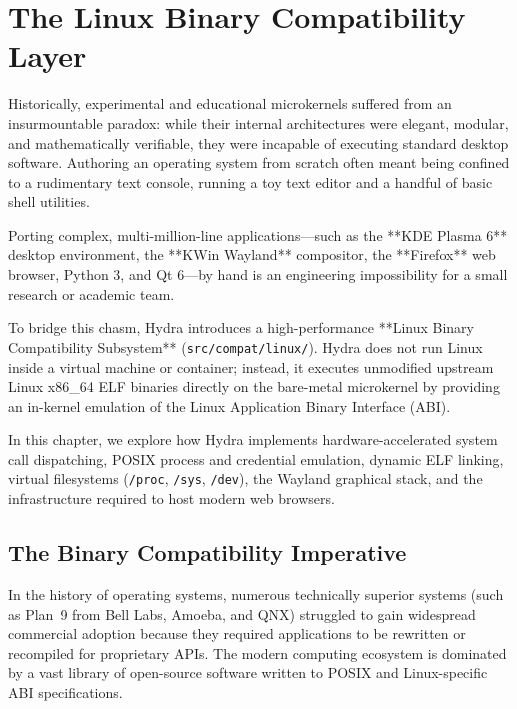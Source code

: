 \chapter{The Linux Binary Compatibility Layer}
\label{chap:linux_compat}

Historically, experimental and educational microkernels suffered from an insurmountable paradox: while their internal architectures were elegant, modular, and mathematically verifiable, they were incapable of executing standard desktop software. Authoring an operating system from scratch often meant being confined to a rudimentary text console, running a toy text editor and a handful of basic shell utilities.

Porting complex, multi-million-line applications---such as the **KDE Plasma 6** desktop environment, the **KWin Wayland** compositor, the **Firefox** web browser, Python 3, and Qt 6---by hand is an engineering impossibility for a small research or academic team.

To bridge this chasm, Hydra introduces a high-performance **Linux Binary Compatibility Subsystem** (\texttt{src/compat/linux/}). Hydra does not run Linux inside a virtual machine or container; instead, it executes unmodified upstream Linux x86\_64 ELF binaries directly on the bare-metal microkernel by providing an in-kernel emulation of the Linux Application Binary Interface (ABI).

In this chapter, we explore how Hydra implements hardware-accelerated system call dispatching, POSIX process and credential emulation, dynamic ELF linking, virtual filesystems (\texttt{/proc}, \texttt{/sys}, \texttt{/dev}), the Wayland graphical stack, and the infrastructure required to host modern web browsers.

\section{The Binary Compatibility Imperative}
\label{sec:compat_imperative}

In the history of operating systems, numerous technically superior systems (such as Plan~9 from Bell Labs, Amoeba, and QNX) struggled to gain widespread commercial adoption because they required applications to be rewritten or recompiled for proprietary APIs. The modern computing ecosystem is dominated by a vast library of open-source software written to POSIX and Linux-specific ABI specifications.

